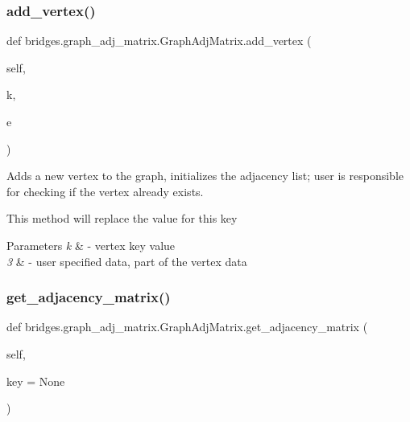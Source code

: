\subsubsection{\texorpdfstring{add\+\_\+vertex()}{add\_vertex()}}
{\footnotesize\ttfamily def bridges.\+graph\+\_\+adj\+\_\+matrix.\+Graph\+Adj\+Matrix.\+add\+\_\+vertex (\begin{DoxyParamCaption}\item[{}]{self,  }\item[{}]{k,  }\item[{}]{e }\end{DoxyParamCaption})}



Adds a new vertex to the graph, initializes the adjacency list; user is responsible for checking if the vertex already exists. 

This method will replace the value for this key


\begin{DoxyParams}{Parameters}
{\em k} & -\/ vertex key value \\
\hline
{\em 3} & -\/ user specified data, part of the vertex data \\
\hline
\end{DoxyParams}
\mbox{\label{classbridges_1_1graph__adj__matrix_1_1_graph_adj_matrix_aa64d4ed1525c6b4959269df0e4090e01}} 
\subsubsection{\texorpdfstring{get\+\_\+adjacency\+\_\+matrix()}{get\_adjacency\_matrix()}}
{\footnotesize\ttfamily def bridges.\+graph\+\_\+adj\+\_\+matrix.\+Graph\+Adj\+Matrix.\+get\+\_\+adjacency\+\_\+matrix (\begin{DoxyParamCaption}\item[{}]{self,  }\item[{}]{key = {\ttfamily None} }\end{DoxyParamCaption})}



